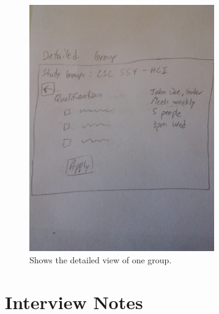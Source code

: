 \documentclass[conference]{IEEEtran}
\begin{document}
\begin{figure}[ht!]
\centering
\includegraphics[width=80mm]{figures/detailedGroup}
\caption{Shows the detailed view of one group. \label{fig:detailedGroup}}
\end{figure}


\section{Interview Notes}
\blindtext



\end{document}
